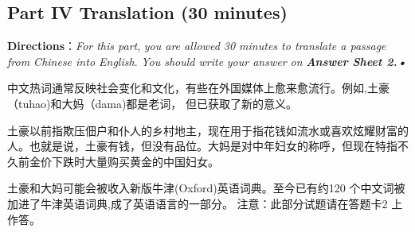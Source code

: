 \documentclass[UTF8,11pt]{ctexart}
\begin{document}
\subsection*{\textbf{Part} IV \textbf{Translation} \textbf{(30 minutes)}}


\textbf{Directions}：\textit{For this part},\textit{ you are allowed 30 minutes to translate a passage from Chinese into English}.\textit{ You should write} \textit{your answer on}\textbf{\textit{ Answer Sheet 2.•}}


中文热词通常反映社会变化和文化，有些在外国媒体上愈来愈流行。例如,土豪（tuhao)和大妈（dama)都是老词， 但已获取了新的意义。


土豪以前指欺压佃户和仆人的乡村地主，现在用于指花钱如流水或喜欢炫耀财富的人。也就是说，土豪有钱，但没有品位。大妈是对中年妇女的称呼，但现在特指不久前金价下跌时大量购买黄金的中国妇女。


土豪和大妈可能会被收入新版牛津(Oxford)英语词典。至今已有约120 个中文词被加进了牛津英语词典,成了英语语言的一部分。 注意：此部分试题请在答题卡2 上作答。
\end{document}
